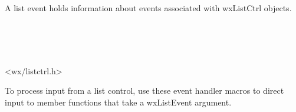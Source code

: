 \section{}\label{wxlistevent}

A list event holds information about events associated with wxListCtrl objects.


\\
\\
\\


<wx/listctrl.h>


To process input from a list control, use these event handler macros to direct input to member
functions that take a wxListEvent argument.

